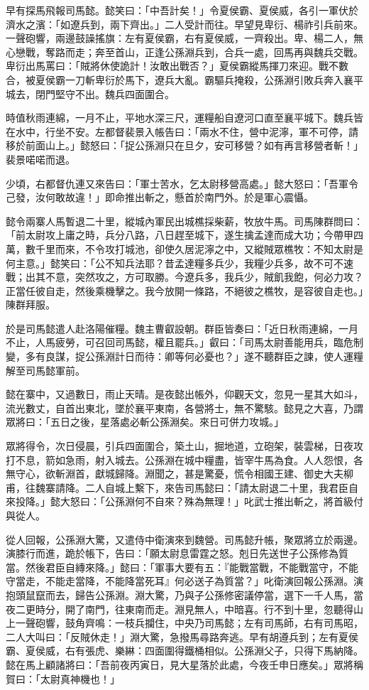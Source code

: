 早有探馬飛報司馬懿。懿笑曰：「中吾計矣！」令夏侯霸、夏侯威，各引一軍伏於濟水之濱：「如遼兵到，兩下齊出。」二人受計而往。早望見卑衍、楊祚引兵前來。一聲砲響，兩邊鼓譟搖旗：左有夏侯霸，右有夏侯威，一齊殺出。卑、楊二人，無心戀戰，奪路而走；奔至首山，正逢公孫淵兵到，合兵一處，回馬再與魏兵交戰。卑衍出馬罵曰：「賊將休使詭計！汝敢出戰否？」夏侯霸縱馬揮刀來迎。戰不數合，被夏侯霸一刀斬卑衍於馬下，遼兵大亂。霸驅兵掩殺，公孫淵引敗兵奔入襄平城去，閉門堅守不出。魏兵四面圍合。

時值秋雨連綿，一月不止，平地水深三尺，運糧船自遼河口直至襄平城下。魏兵皆在水中，行坐不安。左都督裴景入帳告曰：「兩水不住，營中泥濘，軍不可停，請移於前面山上。」懿怒曰：「捉公孫淵只在旦夕，安可移營？如有再言移營者斬！」裴景喏喏而退。

少頃，右都督仇連又來告曰：「軍士苦水，乞太尉移營高處。」懿大怒曰：「吾軍令己發，汝何敢故違！」即命推出斬之，懸首於南門外。於是軍心震懾。

懿令兩寨人馬暫退二十里，縱城內軍民出城樵採柴薪，牧放牛馬。司馬陳群問曰：「前太尉攻上庸之時，兵分八路，八日趕至城下，遂生擒孟達而成大功；今帶甲四萬，數千里而來，不令攻打城池，卻使久居泥濘之中，又縱賊眾樵牧：不知太尉是何主意。」懿笑曰：「公不知兵法耶？昔孟達糧多兵少，我糧少兵多，故不可不速戰；出其不意，突然攻之，方可取勝。今遼兵多，我兵少，賊飢我飽，何必力攻？正當任彼自走，然後乘機擊之。我今放開一條路，不絕彼之樵牧，是容彼自走也。」陳群拜服。

於是司馬懿遣人赴洛陽催糧。魏主曹叡設朝。群臣皆奏曰：「近日秋雨連綿，一月不止，人馬疲勞，可召回司馬懿，權且罷兵。」叡曰：「司馬太尉善能用兵，臨危制變，多有良謀，捉公孫淵計日而待：卿等何必憂也？」遂不聽群臣之諫，使人運糧解至司馬懿軍前。

懿在寨中，又過數日，雨止天晴。是夜懿出帳外，仰觀天文，忽見一星其大如斗，流光數丈，自首出東北，墜於襄平東南，各營將士，無不驚駭。懿見之大喜，乃謂眾將曰：「五日之後，星落處必斬公孫淵矣。來日可併力攻城。」

眾將得令，次日侵晨，引兵四面圍合，築土山，掘地道，立砲架，裝雲梯，日夜攻打不息，箭如急雨，射入城去。公孫淵在城中糧盡，皆宰牛馬為食。人人怨恨，各無守心，欲斬淵首，獻城歸降。淵聞之，甚是驚憂，慌令相國王建、御史大夫柳甫，往魏寨請降。二人自城上繫下，來告司馬懿曰：「請太尉退二十里，我君臣自來投降。」懿大怒曰：「公孫淵何不自來？殊為無理！」叱武士推出斬之，將首級付與從人。

從人回報，公孫淵大驚，又遣侍中衛演來到魏營。司馬懿升帳，聚眾將立於兩邊。演膝行而進，跪於帳下，告曰：「願太尉息雷霆之怒。剋日先送世子公孫修為質當。然後君臣自縳來降。」懿曰：「軍事大要有五：『能戰當戰，不能戰當守，不能守當走，不能走當降，不能降當死耳』何必送子為質當？」叱衛演回報公孫淵。演抱頭鼠竄而去，歸告公孫淵。淵大驚，乃與子公孫修密議停當，選下一千人馬，當夜二更時分，開了南門，往東南而走。淵見無人，中暗喜。行不到十里，忽聽得山上一聲砲響，鼓角齊鳴：一枝兵攔住，中央乃司馬懿；左有司馬師，右有司馬昭，二人大叫曰：「反賊休走！」淵大驚，急撥馬尋路奔逃。早有胡遵兵到；左有夏侯霸、夏侯威，右有張虎、樂綝：四面圍得鐵桶相似。公孫淵父子，只得下馬納降。懿在馬上顧諸將曰：「吾前夜丙寅日，見大星落於此處，今夜壬申日應矣。」眾將稱賀曰：「太尉真神機也！」

